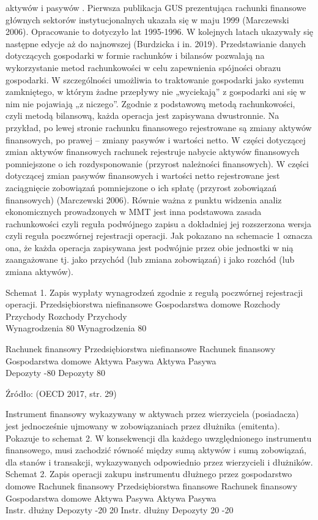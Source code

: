 \documentclass[
]{book}
\begin{document}
aktywów i pasywów . Pierwsza publikacja GUS prezentująca rachunki finansowe głównych sektorów instytucjonalnych ukazała się w maju 1999 (Marczewski 2006). Opracowanie to dotyczyło lat 1995-1996. W kolejnych latach ukazywały się następne edycje aż do najnowszej (Burdzicka i in. 2019). Przedstawianie danych dotyczących gospodarki w formie rachunków i bilansów pozwalają na wykorzystanie metod rachunkowości w celu zapewnienia spójności obrazu gospodarki. W szczególności umożliwia to traktowanie gospodarki jako systemu zamkniętego, w którym żadne przepływy nie „wyciekają'' z gospodarki ani się w nim nie pojawiają „z niczego''. Zgodnie z podstawową metodą rachunkowości, czyli metodą bilansową, każda operacja jest zapisywana dwustronnie. Na przykład, po lewej stronie rachunku finansowego rejestrowane są zmiany aktywów finansowych, po prawej -- zmiany pasywów i wartości netto. W części dotyczącej zmian aktywów finansowych rachunek rejestruje nabycie aktywów finansowych pomniejszone o ich rozdysponowanie (przyrost należności finansowych). W części dotyczącej zmian pasywów finansowych i wartości netto rejestrowane jest zaciągnięcie zobowiązań pomniejszone o ich spłatę (przyrost zobowiązań finansowych) (Marczewski 2006). Równie ważna z punktu widzenia analiz ekonomicznych prowadzonych w MMT jest inna podstawowa zasada rachunkowości czyli reguła podwójnego zapisu a dokładniej jej rozszerzona wersja czyli reguła poczwórnej rejestracji operacji. Jak pokazano na schemacie 1 oznacza ona, że każda operacja zapisywana jest podwójnie przez obie jednostki w nią zaangażowane tj. jako przychód (lub zmiana zobowiązań) i jako rozchód (lub zmiana aktywów).

Schemat 1. Zapis wypłaty wynagrodzeń zgodnie z regułą poczwórnej rejestracji operacji. Przedsiębiorstwa niefinansowe Gospodarstwa domowe Rozchody Przychody Rozchody Przychody\\
Wynagrodzenia 80 Wynagrodzenia 80

Rachunek finansowy Przedsiębiorstwa niefinansowe Rachunek finansowy Gospodarstwa domowe Aktywa Pasywa Aktywa Pasywa\\
Depozyty -80 Depozyty 80

Źródło: (OECD 2017, str. 29)

Instrument finansowy wykazywany w aktywach przez wierzyciela (posiadacza) jest jednocześnie ujmowany w zobowiązaniach przez dłużnika (emitenta). Pokazuje to schemat 2. W konsekwencji dla każdego uwzględnionego instrumentu finansowego, musi zachodzić równość między sumą aktywów i sumą zobowiązań, dla stanów i transakcji, wykazywanych odpowiednio przez wierzycieli i dłużników. Schemat 2. Zapis operacji zakupu instrumentu dłużnego przez gospodarstwo domowe Rachunek finansowy Przedsiębiorstwa finansowe Rachunek finansowy Gospodarstwa domowe Aktywa Pasywa Aktywa Pasywa\\
Instr. dłużny Depozyty -20 20 Instr. dłużny Depozyty 20 -20
\end{document}
